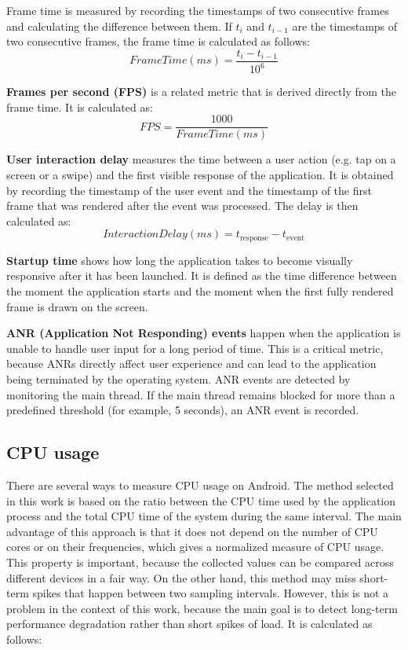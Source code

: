 Frame time is measured by recording the timestamps of two consecutive frames and calculating the difference between them. If $t_i$ and $t_{i-1}$ are the timestamps of two consecutive frames, the frame time is calculated as follows:
\begin{equation}
    FrameTime(ms) = \frac{t_i - t_{i-1}}{10^6}
\end{equation}

\textbf{Frames per second (FPS)} is a related metric that is derived directly from the frame time. It is calculated as:
\begin{equation}
    FPS = \frac{1000}{FrameTime(ms)}
\end{equation}

\textbf{User interaction delay} measures the time between a user action (e.g. tap on a screen or a swipe) and the first visible response of the application. It is obtained by recording the timestamp of the user event and the timestamp of the first frame that was rendered after the event was processed. The delay is then calculated as:
\begin{equation}
    InteractionDelay(ms) = t_{\text{response}} - t_{\text{event}}
\end{equation}

\textbf{Startup time} shows how long the application takes to become visually responsive after it has been launched. It is defined as the time difference between the moment the application starts and the moment when the first fully rendered frame is drawn on the screen.

\textbf{ANR (Application Not Responding) events} happen when the application is unable to handle user input for a long period of time. This is a critical metric, because ANRs directly affect user experience and can lead to the application being terminated by the operating system. ANR events are detected by monitoring the main thread. If the main thread remains blocked for more than a predefined threshold (for example, 5 seconds), an ANR event is recorded.

\subsection{CPU usage}

There are several ways to measure CPU usage on Android. The method selected in this work is based on the ratio between the CPU time used by the application process and the total CPU time of the system during the same interval. The main advantage of this approach is that it does not depend on the number of CPU cores or on their frequencies, which gives a normalized measure of CPU usage. This property is important, because the collected values can be compared across different devices in a fair way. On the other hand, this method may miss short-term spikes that happen between two sampling intervals. However, this is not a problem in the context of this work, because the main goal is to detect long-term performance degradation rather than short spikes of load. It is calculated as follows:

